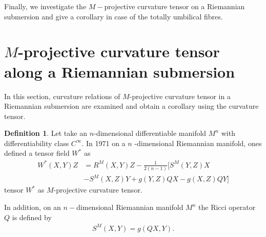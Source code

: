 \documentclass{birkjour}
\theoremstyle{definition}
\newtheorem{definition}[theorem]{Definition}
\theoremstyle{remark}
\numberwithin{equation}{section}
\begin{document}
Finally, we investigate the $M-$projective curvature tensor on a Riemannian submersion and give a corollary in case of the totally umbilical fibres.
\section{$M$-projective curvature tensor along a Riemannian submersion}
In this section, curvature relations of $M$-projective curvature tensor in a Riemannian submersion are examined and obtain a corollary using the curvature tensor.
\begin{definition}
	Let take an $n$-dimensional differentiable manifold $M^n$ with
	differentiability class $C^{\infty }$. In 1971 on a $n$%
	-dimensional Riemannian manifold, ones \cite{PM} defined a tensor
	field $W^{\ast }$ as
	\begin{align*}
	W^{\ast }(X,Y)Z&=R^M(X,Y)Z-\frac{1}{2(n-1)}[S^M(Y,Z)X\\
	&-S^M(X,Z)Y+g(Y,Z)QX-g(X,Z)QY]\label{5.0}
	\end{align*}
	tensor $W^{\ast }$ as $M$-projective curvature tensor.
\end{definition}
In addition, on an $n-$dimensional Riemannian manifold $M^n$ the Ricci operator $Q$ is defined by
\begin{align*}
S^M(X,Y) = g(QX,Y).
\end{align*}
\end{document}

